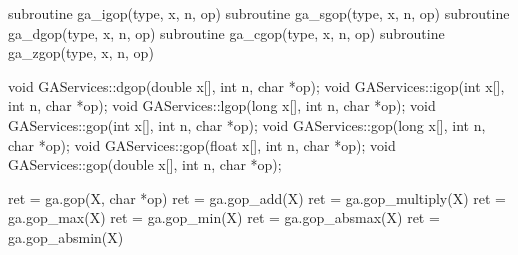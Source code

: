 \documentclass[12pt]{article}
\begin{document}
\begin{fapi}
\begin{fcode}
subroutine ga_igop(type, x, n, op)
subroutine ga_sgop(type, x, n, op)
subroutine ga_dgop(type, x, n, op)
subroutine ga_cgop(type, x, n, op)
subroutine ga_zgop(type, x, n, op)
\end{fcode}
\begin{funcargs}
\end{funcargs}
\end{fapi}

\begin{cxxapi}
\begin{cxxcode}
void GAServices::dgop(double x[], int n, char *op);
void GAServices::igop(int x[], int n, char *op);
void GAServices::lgop(long x[], int n, char *op);
void GAServices::gop(int x[], int n, char *op);
void GAServices::gop(long x[], int n, char *op);
void GAServices::gop(float x[], int n, char *op);
void GAServices::gop(double x[], int n, char *op);
\end{cxxcode}
\begin{funcargs}
\end{funcargs}
\end{cxxapi}

\begin{pyapi}
\begin{pycode}
ret = ga.gop(X, char *op)
ret = ga.gop_add(X)
ret = ga.gop_multiply(X)
ret = ga.gop_max(X)
ret = ga.gop_min(X)
ret = ga.gop_absmax(X)
ret = ga.gop_absmin(X)
\end{pycode}
\begin{funcargs}
\end{funcargs}
\end{pyapi}
\end{document}

